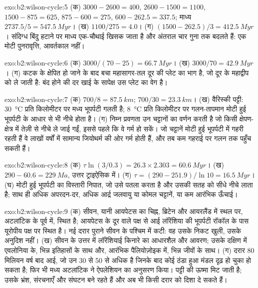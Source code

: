 \begin{solution}{exo:b2:wilson-cycle:5}
(क) $3000 - 2600 = 400$, $2600 - 1500 = 1100$, $1500 - 875 = 625$, $875 - 600 = 275$, $600 -
262.5 = 337.5$; माध्य $2737.5/5 = \qty{547.5}{Myr}$। (ख) $1100/275 = 4.0$। (ग) $(1500 -
262.5)/3 = \qty{412.5}{Myr}$। संदिग्ध बिंदु हटाने पर माध्य एक-चौथाई खिसक जाता है
और अंतराल चार गुना तक बदलते हैं: एक मोटी पुनरावृत्ति, आवर्तकाल नहीं।
\end{solution}

\begin{solution}{exo:b2:wilson-cycle:6}
(क) $3000/(70 - 25) = \qty{66.7}{Myr}$। (ख) $3000/70 = \qty{42.9}{Myr}$। (ग) कटक के
क्षेपित हो जाने के बाद बचा महासागर-तल दूर की प्लेट का भाग है, जो दूर के
महाद्वीप को ले जाती है: बंद होने की दर खाई के सापेक्ष उस प्लेट का वेग है।
\end{solution}

\begin{solution}{exo:b2:wilson-cycle:7}
(क) $700/8 = \qty{87.5}{km}$; $700/30 = \qty{23.3}{km}$। (ख) वैरिस्की पट्टी:
\qty{30}{\celsius} प्रति किलोमीटर पर मध्य भूपर्पटी गलती है; \qty{8}{\celsius} प्रति किलोमीटर पर
गलन-तापमान मोटी हुई भूपर्पटी के आधार से भी नीचे होता है। (ग) निम्न प्रवणता
उन चट्टानों का वर्णन करती है जो किसी क्षेपण-क्षेत्र में तेज़ी से नीचे ले जाई गईं, इससे पहले कि वे गर्म हो सकें। जो चट्टानें
मोटी हुई भूपर्पटी में गहरी रहती हैं वे लाखों वर्षों में सामान्य जियोथर्म की ओर गर्म होती हैं, और
तब कम गहराई पर गलन तक पहुँच सकती हैं।
\end{solution}

\begin{solution}{exo:b2:wilson-cycle:8}
(क) $\tau\ln(3/0.3) = 26.3\times2.303 = \qty{60.6}{Myr}$। (ख) $290 - 60.6 = \qty{229}{Ma}$,
उत्तर ट्राइऐसिक में। (ग) $\tau = (290 - 251.9)/\ln10 = \qty{16.5}{Myr}$। (घ) मोटी हुई भूपर्पटी का
विस्तारी निपात, जो उसे पतला करता है और उसकी सतह को सीधे नीचे लाता है; साथ ही
अधिक अपरदन-दर, अधिक आर्द्र जलवायु या कोमल चट्टानें, या कम आरंभिक ऊँचाई।
\end{solution}

\begin{solution}{exo:b2:wilson-cycle:9}
(क) सीवन, यानी आयपेटस का चिह्न, ब्रिटेन और आयरलैंड में स्थल पर, अटलांटिक के
पूर्व में, स्थित है; आयपेटस के दूर वाले पक्ष से आई लॉरेंशिया की भूपर्पटी रॉकॉल के पास
यूरोपीय पक्ष पर स्थित है। नई दरार पुराने सीवन के पश्चिम में कटी: वह उसके निकट खुली, उसके अनुदिश नहीं।
(ख) सीवन के उत्तर में लॉरेंशियाई किनारे का आधारशैल और आवरण; उसके दक्षिण में
एवलोनिया के, भिन्न इतिहासों के साथ और, आरंभिक पैलियोज़ोइक में, भिन्न जीवों के साथ। (ग) दरार
80 मिलियन वर्ष बाद आई, जो उन 30 से 50 से अधिक है जिनके बाद कोई ठंडा हुआ मंडल
दृढ़ हो चुका हो सकता है; फिर भी मध्य अटलांटिक ने ऐपलेशियन का अनुसरण किया। पट्टी की ऊष्मा मिट जाती है; उसके
भ्रंश, संरचनाएँ और संघटन बने रहते हैं और अब भी किसी दरार को दिशा दे सकते हैं।
\end{solution}

